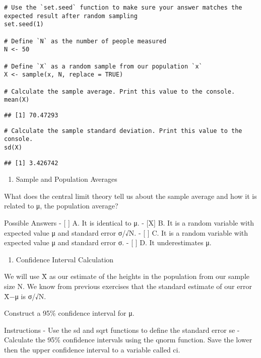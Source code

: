 \documentclass[
]{article}
\providecommand{\tightlist}{%
  \setlength{\itemsep}{0pt}\setlength{\parskip}{0pt}}
\begin{document}
\begin{verbatim}
# Use the `set.seed` function to make sure your answer matches the expected result after random sampling
set.seed(1)

# Define `N` as the number of people measured
N <- 50

# Define `X` as a random sample from our population `x`
X <- sample(x, N, replace = TRUE)

# Calculate the sample average. Print this value to the console.
mean(X)
\end{verbatim}

\begin{verbatim}
## [1] 70.47293
\end{verbatim}

\begin{verbatim}
# Calculate the sample standard deviation. Print this value to the console.
sd(X)
\end{verbatim}

\begin{verbatim}
## [1] 3.426742
\end{verbatim}

\begin{enumerate}
\def\labelenumi{\arabic{enumi}.}
\setcounter{enumi}{2}
\tightlist
\item
  Sample and Population Averages
\end{enumerate}

What does the central limit theory tell us about the sample average and
how it is related to μ, the population average?

Possible Answers - {[} {]} A. It is identical to μ. - {[}X{]} B. It is a
random variable with expected value μ and standard error σ/√N. - {[} {]}
C. It is a random variable with expected value μ and standard error σ. -
{[} {]} D. It underestimates μ.

\begin{enumerate}
\def\labelenumi{\arabic{enumi}.}
\setcounter{enumi}{3}
\tightlist
\item
  Confidence Interval Calculation
\end{enumerate}

We will use X̄ as our estimate of the heights in the population from our
sample size N. We know from previous exercises that the standard
estimate of our error X̄−μ is σ/√N.

Construct a 95\% confidence interval for μ.

Instructions - Use the sd and sqrt functions to define the standard
error se - Calculate the 95\% confidence intervals using the qnorm
function. Save the lower then the upper confidence interval to a
variable called ci.
\end{document}
